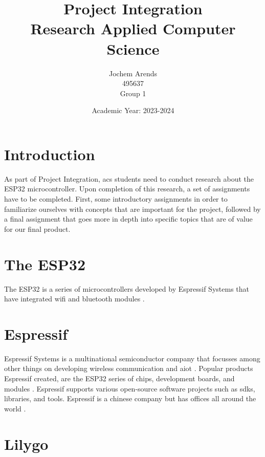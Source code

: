 \documentclass{article}
\title{Project Integration \\ Research Applied Computer Science}
\author{Jochem Arends \\ 495637 \\ Group 1}
\date{Academic Year: 2023-2024}
\begin{document}
\maketitle
\newpage

\tableofcontents
\clearpage

\printglossary[type=\acronymtype,{title=Abbreviations}]
\printglossary[type=main]
\clearpage

\section{Introduction}
As part of Project Integration, \gls{acs} students need to conduct research about the ESP32 microcontroller.
Upon completion of this research, a set of assignments have to be completed.
First, some introductory assignments in order to familiarize ourselves with concepts that are important for the project, followed by a final assignment that goes more in depth into specific topics that are of value for our final product.

\section{The ESP32}
The ESP32 is a series of microcontrollers developed by Espressif Systems that have integrated \gls{wifi} and \gls{bluetooth} modules \cite{esp32-ds}.

\section{Espressif}
Espressif Systems is a multinational semiconductor company that focusses among other things on developing wireless communication and \gls{aiot} \cite{aboutespressif}.
Popular products Espressif created, are the ESP32 series of chips, development boards, and modules \cite{aboutespressif}.
Espressif supports various open-source software projects such as \glspl{sdk}, libraries, and tools.
Espressif is a chinese company but has offices all around the world \cite{aboutespressif}.

\section {Lilygo}


\clearpage








\end{document}

